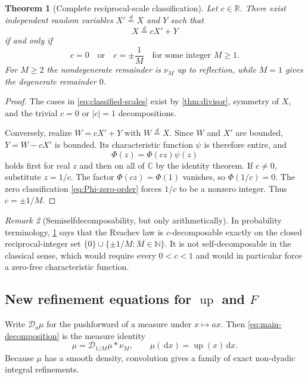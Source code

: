 \documentclass[11pt,oneside]{article}
\newtheorem{theorem}{Theorem}[section]
\theoremstyle{definition}
\theoremstyle{remark}
\newtheorem{remark}[theorem]{Remark}
\newcommand{\R}{\mathbb R}
\newcommand{\C}{\mathbb C}
\newcommand{\N}{\mathbb N}
\newcommand{\Up}{\operatorname{up}}
\newcommand{\dd}{\,\mathrm d}
\numberwithin{equation}{section}
\newcommand{\D}{\mathcal D}
\newcommand{\1}{\mathbf 1}
\begin{document}
\begin{theorem}[Complete reciprocal-scale classification]
\label{thm:classification}
Let $c\in\R$.  There exist independent random variables $X'\overset d=X$ and $Y$ such
that
\begin{equation}
 X\overset d=cX'+Y
 \label{eq:c-decomp}
\end{equation}
if and only if
\begin{equation}
 c=0
 \quad\text{or}\quad
 c=\pm\frac1M
 \quad\text{for some integer }M\ge1.
 \label{eq:classified-scales}
\end{equation}
For $M\ge2$ the nondegenerate remainder is $\nu_M$ up to reflection, while $M=1$
gives the degenerate remainder $0$.
\end{theorem}

\begin{proof}
The cases in \eqref{eq:classified-scales} exist by \cref{thm:divisor}, symmetry of $X$,
and the trivial $c=0$ or $|c|=1$ decompositions.

Conversely, realize $W=cX'+Y$ with $W\overset d=X$.  Since $W$ and $X'$ are bounded,
$Y=W-cX'$ is bounded.  Its characteristic function $\psi$ is therefore entire, and
\begin{equation}
 \Phi(z)=\Phi(cz)\psi(z)
 \label{eq:entire-factorization}
\end{equation}
holds first for real $z$ and then on all of $\C$ by the identity theorem.  If $c\ne0$,
substitute $z=1/c$.  The factor $\Phi(cz)=\Phi(1)$ vanishes, so $\Phi(1/c)=0$.
The zero classification \eqref{eq:Phi-zero-order} forces $1/c$ to be a nonzero integer.
Thus $c=\pm1/M$.
\end{proof}

\begin{remark}[Semiselfdecomposability, but only arithmetically]
In probability terminology, \cref{thm:classification} says that the Rvachev law is
$c$-decomposable exactly on the closed reciprocal-integer set
$\{0\}\cup\{\pm1/M:M\in\N\}$.  It is not self-decomposable in the classical sense,
which would require every $0<c<1$ and would in particular force a zero-free
characteristic function.
\end{remark}

\subsection{New refinement equations for $\Up$ and $F$}

Write $\D_a\mu$ for the pushforward of a measure under $x\mapsto ax$.  Then
\eqref{eq:main-decomposition} is the measure identity
\begin{equation}
 \mu=\D_{1/M}\mu*\nu_M,
 \qquad \mu(\dd x)=\Up(x)\dd x.
 \label{eq:measure-refinement}
\end{equation}
Because $\mu$ has a smooth density, convolution gives a family of exact non-dyadic
integral refinements.
\end{document}
